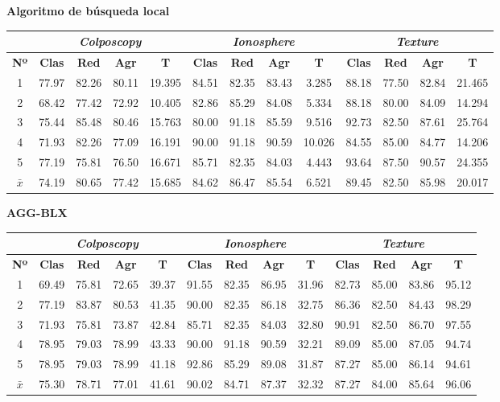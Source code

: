 \documentclass[12pt]{article}
\begin{document}
{\color{red}\textbf{Algoritmo de búsqueda local}}

\begin{table}[ht!]
\begin{tabular}{ccccc|cccc|cccc}
\centering
 & \multicolumn{4}{c}{\textit{Colposcopy}} & \multicolumn{4}{c}{\textit{Ionosphere}} & \multicolumn{4}{c}{\textit{Texture}} \\ \hline
\textbf{Nº} & \textbf{Clas} & \textbf{Red} & \textbf{Agr} & \textbf{T} & \textbf{Clas} & \textbf{Red} & \textbf{Agr} & \textbf{T} & \textbf{Clas} & \textbf{Red} & \textbf{Agr} & \textbf{T} \\ \hline
1 & 77.97 & 82.26 & 80.11 & 19.395 & 84.51 & 82.35 & 83.43 & 3.285 & 88.18 & 77.50 & 82.84 & 21.465\\
2 & 68.42 & 77.42 & 72.92 & 10.405 & 82.86 & 85.29 & 84.08 & 5.334 & 88.18 & 80.00 & 84.09 & 14.294\\
3 & 75.44 & 85.48 & 80.46 & 15.763 & 80.00 & 91.18 & 85.59 & 9.516 & 92.73 & 82.50 & 87.61 & 25.764\\
4 & 71.93 & 82.26 & 77.09 & 16.191 & 90.00 & 91.18 & 90.59 & 10.026 & 84.55 & 85.00 & 84.77 & 14.206\\
5 & 77.19 & 75.81 & 76.50 & 16.671 & 85.71 & 82.35 & 84.03 & 4.443 & 93.64 & 87.50 & 90.57 & 24.355\\
\hline
$\bar{x}$  & 74.19 & 80.65 & 77.42 & 15.685 & 84.62 & 86.47 & 85.54 & 6.521 & 89.45 & 82.50 & 85.98 & 20.017
\end{tabular}
\end{table}

\textbf{AGG-BLX}

\begin{table}[ht!]
\begin{tabular}{ccccc|cccc|cccc}
\centering
 & \multicolumn{4}{c}{\textit{Colposcopy}} & \multicolumn{4}{c}{\textit{Ionosphere}} & \multicolumn{4}{c}{\textit{Texture}} \\ \hline
\textbf{Nº} & \textbf{Clas} & \textbf{Red} & \textbf{Agr} & \textbf{T} & \textbf{Clas} & \textbf{Red} & \textbf{Agr} & \textbf{T} & \textbf{Clas} & \textbf{Red} & \textbf{Agr} & \textbf{T} \\ \hline
1 & 69.49 & 75.81 & 72.65 & 39.37  & 91.55 & 82.35 & 86.95 & 31.96  & 82.73 & 85.00 & 83.86 & 95.12 \\
2 & 77.19 & 83.87 & 80.53 & 41.35  & 90.00 & 82.35 & 86.18 & 32.75  & 86.36 & 82.50 & 84.43 & 98.29 \\
3 & 71.93 & 75.81 & 73.87 & 42.84  & 85.71 & 82.35 & 84.03 & 32.80  & 90.91 & 82.50 & 86.70 & 97.55 \\
4 & 78.95 & 79.03 & 78.99 & 43.33  & 90.00 & 91.18 & 90.59 & 32.21  & 89.09 & 85.00 & 87.05 & 94.74 \\
5 & 78.95 & 79.03 & 78.99 & 41.18  & 92.86 & 85.29 & 89.08 & 31.87  & 87.27 & 85.00 & 86.14 & 94.61 \\
\hline
$\bar{x}$  & 75.30 & 78.71 & 77.01 & 41.61 & 90.02 & 84.71 & 87.37 & 32.32  & 87.27 & 84.00 & 85.64 & 96.06
\end{tabular}
\end{table}
\end{document}
